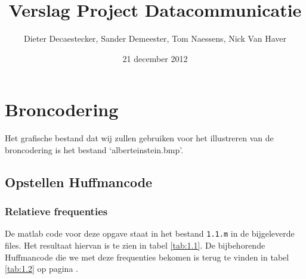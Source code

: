 \documentclass[11pt,a4paper]{article}
\author{Dieter Decaestecker, Sander Demeester, Tom Naessens, Nick Van Haver}
\title{Verslag Project Datacommunicatie}
\date{21 december 2012}
\begin{document}
\maketitle
\tableofcontents


\section{Broncodering}

Het grafische bestand dat wij zullen gebruiken voor het illustreren van de broncodering is het bestand `alberteinstein.bmp'.

\subsection{Opstellen Huffmancode}
\subsubsection{Relatieve frequenties}
De matlab code voor deze opgave staat in het bestand \texttt{1.1.m} in de bijgeleverde files. Het resultaat hiervan is te zien in tabel \ref{tab:1.1}. De bijbehorende Huffmancode die we met deze frequenties bekomen is terug te vinden in tabel \ref{tab:1.2} op pagina \pageref{tab:1.2}.
\end{document}
